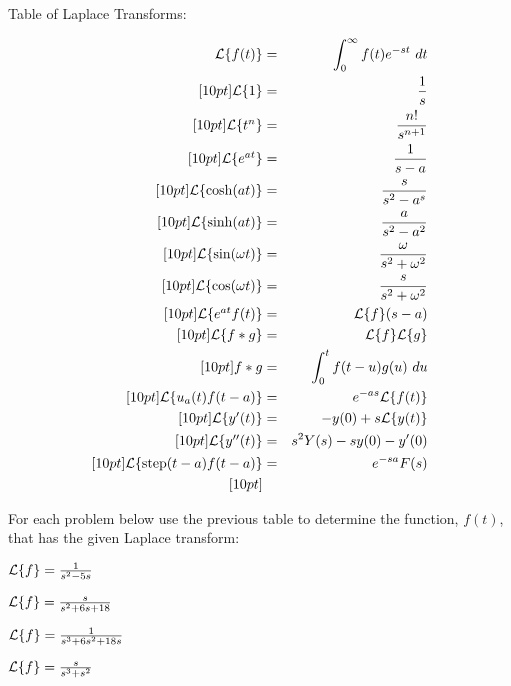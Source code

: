 \begin{problem}
Table of Laplace Transforms:

\begin{eqnarray*}
  \laplace{f(t)}  & = & \int^\infty_0 f(t) e^{-st} ~ dt \\ [10pt]
  \laplace{1}      & = & \frac{1}{s} \\ [10pt]
  \laplace{t^n}    & = & \frac{n!}{s^{n+1}} \\ [10pt]
  \laplace{e^{at}} & = & \frac{1}{s-a} \\ [10pt]
  \laplace{\cosh(at)} & = & \frac{s}{s^2-a^s} \\ [10pt]
  \laplace{\sinh(at)} & = & \frac{a}{s^2-a^2} \\ [10pt]
  \laplace{\sin(\omega t)} & = & \frac{\omega}{s^2+\omega^2} \\ [10pt]
  \laplace{\cos(\omega t)} & = & \frac{s}{s^2+\omega^2} \\ [10pt]
  \laplace{e^{at}f(t)} & = & \laplace{f}(s-a) \\ [10pt]
  \laplace{f*g} & = & \laplace{f}\laplace{g} \\ [10pt]
  f*g & = & \int^t_0 f(t-u) g(u) ~ du \\ [10pt]
  \laplace{u_a(t) f(t-a)} & = & e^{-as} \laplace{f(t)} \\ [10pt]
  \laplace{y'(t)} & = & -y(0) + s \laplace{y(t)} \\ [10pt]
  \laplace{y''(t)}& = & s^2 Y(s) - sy(0) - y'(0) \\ [10pt]
  \laplace{\mathrm{step}(t-a)f(t-a)} & = & e^{-sa}F(s) \\ [10pt]
\end{eqnarray*}



\item For each problem below use the previous table to determine the
  function, $f(t)$, that has the given Laplace transform:

  \begin{subproblem}
    \item $\laplace{f}  =  \frac{1}{s^2-5s}$
      \vfill

    \item $\laplace{f}  =  \frac{s}{s^2+6s+18}$
      \vfill


      \clearpage

    \item $\laplace{f}  =  \frac{1}{s^3+6s^2+18s}$
      \vfill


    \item $\laplace{f}  =  \frac{s}{s^3+s^2}$
      \vfill

  \end{subproblem}


\end{problem}

